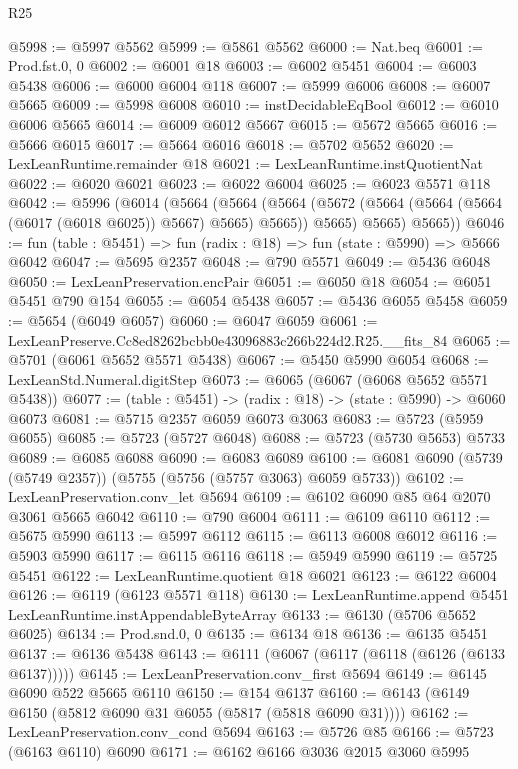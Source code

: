 \begin{lexlean}{R25}
\begin{coremodule}
@5998 := @5997 @5562
@5999 := @5861 @5562
@6000 := Nat.beq
@6001 := Prod.fst.{0, 0}
@6002 := @6001 @18
@6003 := @6002 @5451
@6004 := @6003 @5438
@6006 := @6000 @6004 @118
@6007 := @5999 @6006
@6008 := @6007 @5665
@6009 := @5998 @6008
@6010 := instDecidableEqBool
@6012 := @6010 @6006 @5665
@6014 := @6009 @6012 @5667
@6015 := @5672 @5665
@6016 := @5666 @6015
@6017 := @5664 @6016
@6018 := @5702 @5652
@6020 := LexLeanRuntime.remainder @18
@6021 := LexLeanRuntime.instQuotientNat
@6022 := @6020 @6021
@6023 := @6022 @6004
@6025 := @6023 @5571 @118
@6042 := @5996
    (@6014
      (@5664
        (@5664
          (@5664 (@5672 (@5664 (@5664 (@5664 (@6017 (@6018 @6025)) @5667) @5665) @5665)) @5665)
          @5665)
        @5665))
@6046 := fun (table : @5451) => fun (radix : @18) => fun (state : @5990) => @5666 @6042
@6047 := @5695 @2357
@6048 := @790 @5571
@6049 := @5436 @6048
@6050 := LexLeanPreservation.encPair
@6051 := @6050 @18
@6054 := @6051 @5451 @790 @154
@6055 := @6054 @5438
@6057 := @5436 @6055 @5458
@6059 := @5654 (@6049 @6057)
@6060 := @6047 @6059
@6061 := LexLeanPreserve.Cc8ed8262bcbb0e43096883c266b224d2.R25.__fits_84
@6065 := @5701 (@6061 @5652 @5571 @5438)
@6067 := @5450 @5990 @6054
@6068 := LexLeanStd.Numeral.digitStep
@6073 := @6065 (@6067 (@6068 @5652 @5571 @5438))
@6077 := (table : @5451) -> (radix : @18) -> (state : @5990) -> @6060 @6073
@6081 := @5715 @2357 @6059 @6073 @3063
@6083 := @5723 (@5959 @6055)
@6085 := @5723 (@5727 @6048)
@6088 := @5723 (@5730 @5653) @5733
@6089 := @6085 @6088
@6090 := @6083 @6089
@6100 := @6081 @6090 (@5739 (@5749 @2357)) (@5755 (@5756 (@5757 @3063) @6059 @5733))
@6102 := LexLeanPreservation.conv_let @5694
@6109 := @6102 @6090 @85 @64 @2070 @3061 @5665 @6042
@6110 := @790 @6004
@6111 := @6109 @6110
@6112 := @5675 @5990
@6113 := @5997 @6112
@6115 := @6113 @6008 @6012
@6116 := @5903 @5990
@6117 := @6115 @6116
@6118 := @5949 @5990
@6119 := @5725 @5451
@6122 := LexLeanRuntime.quotient @18 @6021
@6123 := @6122 @6004
@6126 := @6119 (@6123 @5571 @118)
@6130 := LexLeanRuntime.append @5451 LexLeanRuntime.instAppendableByteArray
@6133 := @6130 (@5706 @5652 @6025)
@6134 := Prod.snd.{0, 0}
@6135 := @6134 @18
@6136 := @6135 @5451
@6137 := @6136 @5438
@6143 := @6111 (@6067 (@6117 (@6118 (@6126 (@6133 @6137)))))
@6145 := LexLeanPreservation.conv_first @5694
@6149 := @6145 @6090 @522 @5665 @6110
@6150 := @154 @6137
@6160 := @6143 (@6149 @6150 (@5812 @6090 @31 @6055 (@5817 (@5818 @6090 @31))))
@6162 := LexLeanPreservation.conv_cond @5694
@6163 := @5726 @85
@6166 := @5723 (@6163 @6110) @6090
@6171 := @6162 @6166 @3036 @2015 @3060 @5995

\end{coremodule}
\end{lexlean}
